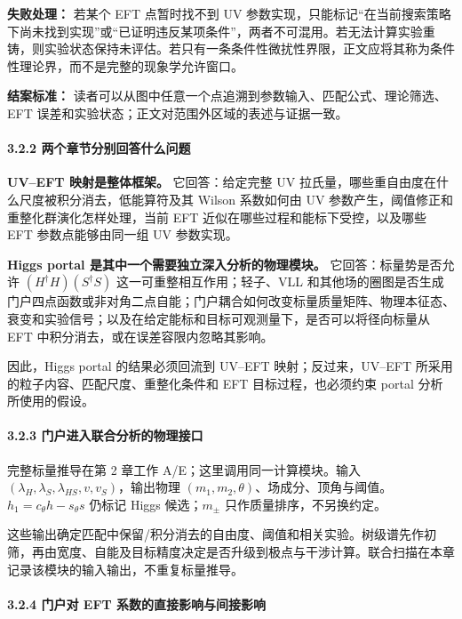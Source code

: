\documentclass[
  chinese,
  UTF8]{ctexart}
\begin{document}
\textbf{失败处理：} 若某个 EFT 点暂时找不到 UV
参数实现，只能标记``在当前搜索策略下尚未找到实现''或``已证明违反某项条件''，两者不可混用。若无法计算实验重铸，则实验状态保持未评估。若只有一条条件性微扰性界限，正文应将其称为条件性理论界，而不是完整的现象学允许窗口。

\textbf{结案标准：}
读者可以从图中任意一个点追溯到参数输入、匹配公式、理论筛选、EFT
误差和实验状态；正文对范围外区域的表述与证据一致。

\paragraph{3.2.2
两个章节分别回答什么问题}\label{ux4e24ux4e2aux7ae0ux8282ux5206ux522bux56deux7b54ux4ec0ux4e48ux95eeux9898}

\textbf{UV--EFT 映射是整体框架。} 它回答：给定完整 UV
拉氏量，哪些重自由度在什么尺度被积分消去，低能算符及其 Wilson 系数如何由
UV 参数产生，阈值修正和重整化群演化怎样处理，当前 EFT
近似在哪些过程和能标下受控，以及哪些 EFT 参数点能够由同一组 UV
参数实现。

\textbf{Higgs portal 是其中一个需要独立深入分析的物理模块。}
它回答：标量势是否允许 \((H^\dagger H)(S^\dagger S)\)
这一可重整相互作用；轻子、VLL
和其他场的圈图是否生成门户四点函数或非对角二点自能；门户耦合如何改变标量质量矩阵、物理本征态、衰变和实验信号；以及在给定能标和目标可观测量下，是否可以将径向标量从
EFT 中积分消去，或在误差容限内忽略其影响。

因此，Higgs portal 的结果必须回流到 UV--EFT 映射；反过来，UV--EFT
所采用的粒子内容、匹配尺度、重整化条件和 EFT 目标过程，也必须约束 portal
分析所使用的假设。

\paragraph{3.2.3
门户进入联合分析的物理接口}\label{ux95e8ux6237ux8fdbux5165ux8054ux5408ux5206ux6790ux7684ux7269ux7406ux63a5ux53e3}

完整标量推导在第 2 章工作 A/E；这里调用同一计算模块。输入
\((\lambda_H,\lambda_S,\lambda_{HS},v,v_S)\)，输出物理
\((m_1,m_2,\theta)\)、场成分、顶角与阈值。\(h_1=c_\theta h-s_\theta s\)
仍标记 Higgs 候选；\(m_\pm\) 只作质量排序，不另换约定。

这些输出确定匹配中保留/积分消去的自由度、阈值和相关实验。树级谱先作初筛，再由宽度、自能及目标精度决定是否升级到极点与干涉计算。联合扫描在本章记录该模块的输入输出，不重复标量推导。

\paragraph{3.2.4 门户对 EFT
系数的直接影响与间接影响}\label{ux95e8ux6237ux5bf9-eft-ux7cfbux6570ux7684ux76f4ux63a5ux5f71ux54cdux4e0eux95f4ux63a5ux5f71ux54cd}
\end{document}
